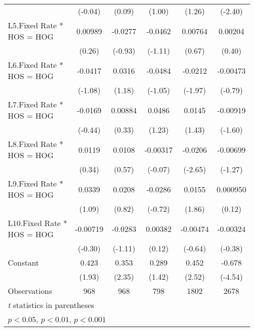 {\begin{longtable}{l*{5}{c}}
                &  (-0.04)         &   (0.09)         &   (1.00)         &   (1.26)         &  (-2.40)         \\
[1em]
L5.Fixed Rate * HOS = HOG&  0.00989         &  -0.0277         &  -0.0462         &  0.00764         &  0.00204         \\
                &   (0.26)         &  (-0.93)         &  (-1.11)         &   (0.67)         &   (0.40)         \\
[1em]
L6.Fixed Rate * HOS = HOG&  -0.0417         &   0.0316         &  -0.0484         &  -0.0212         & -0.00473         \\
                &  (-1.08)         &   (1.18)         &  (-1.05)         &  (-1.97)         &  (-0.79)         \\
[1em]
L7.Fixed Rate * HOS = HOG&  -0.0169         &  0.00884         &   0.0486         &   0.0145         & -0.00919         \\
                &  (-0.44)         &   (0.33)         &   (1.23)         &   (1.43)         &  (-1.60)         \\
[1em]
L8.Fixed Rate * HOS = HOG&   0.0119         &   0.0108         & -0.00317         &  -0.0206\sym{**} & -0.00699         \\
                &   (0.34)         &   (0.57)         &  (-0.07)         &  (-2.65)         &  (-1.27)         \\
[1em]
L9.Fixed Rate * HOS = HOG&   0.0339         &   0.0208         &  -0.0286         &   0.0155         & 0.000950         \\
                &   (1.09)         &   (0.82)         &  (-0.72)         &   (1.86)         &   (0.12)         \\
[1em]
L10.Fixed Rate * HOS = HOG& -0.00719         &  -0.0283         &  0.00382         & -0.00474         & -0.00324         \\
                &  (-0.30)         &  (-1.11)         &   (0.12)         &  (-0.64)         &  (-0.38)         \\
[1em]
Constant        &    0.423         &    0.353\sym{*}  &    0.289         &    0.452\sym{*}  &   -0.678\sym{***}\\
                &   (1.93)         &   (2.35)         &   (1.42)         &   (2.52)         &  (-4.54)         \\
\hline
Observations    &      968         &      968         &      798         &     1802         &     2678         \\
\hline\hline
\multicolumn{6}{l}{\footnotesize \textit{t} statistics in parentheses}\\
\multicolumn{6}{l}{\footnotesize \sym{*} \(p<0.05\), \sym{**} \(p<0.01\), \sym{***} \(p<0.001\)}\\
\end{longtable}
}
